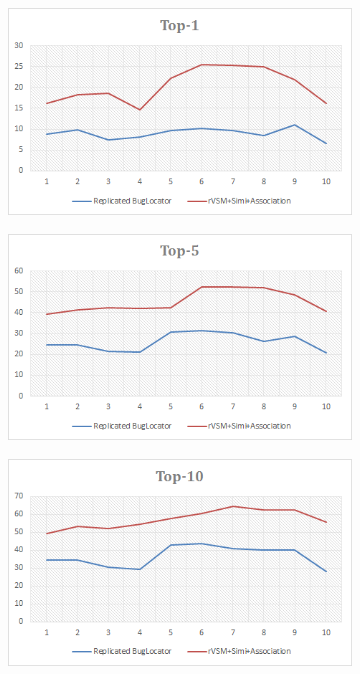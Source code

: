 \documentclass[conference]{IEEEtran}
\begin{document}
\begin{figure}
	\begin{subfigure}[b]{0.33\textwidth}
		\centering
		\includegraphics[width=\textwidth]{RBL+rSAssoTop-1}
	\end{subfigure}
	\begin{subfigure} [b]{0.33\textwidth}
		\centering
		\includegraphics[width=\textwidth]{RBL+rSAssoTop-5}
	\end{subfigure}
	\begin{subfigure} [b]{0.33\textwidth}
		\centering
		\includegraphics[width=\textwidth]{RBL+rSAssoTop-10}
	\end{subfigure}
	

\end{figure}
\end{document}
